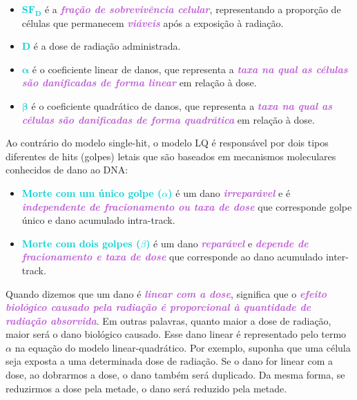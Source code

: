 \documentclass[11pt,a4paper]{article}
\newcounter{exemplo}
\begin{document}
	\begin{exemplo}[onde,]
		\begin{itemize}
			\item \textcolor{DarkTurquoise}{$\mathbf{SF_D}$} é a \textcolor{MediumOrchid}{\textbf{\textit{fração de sobrevivência celular}}}, representando a proporção de células que permanecem \textcolor{MediumOrchid}{\textbf{\textit{viáveis}}} após a exposição à radiação.
			\item \textcolor{DarkTurquoise}{$\mathbf{D}$} é a dose de radiação administrada.
			\item \textcolor{DarkTurquoise}{$\mathbf{\alpha}$} é o coeficiente linear de danos, que representa a \textcolor{MediumOrchid}{\textbf{\textit{taxa na qual as células são danificadas de forma linear}}} em relação à dose.
			\item \textcolor{DarkTurquoise}{$\mathbf{\beta}$} é o coeficiente quadrático de danos, que representa a \textcolor{MediumOrchid}{\textbf{\textit{taxa na qual as células são danificadas de forma quadrática}}} em relação à dose.
		\end{itemize}
	\end{exemplo}

	Ao contrário do modelo single-hit, o modelo LQ é responsável por dois tipos diferentes de hits (golpes) letais que são baseados em mecanismos moleculares conhecidos de dano ao DNA:
	
	\begin{itemize}[label=\textcolor{CarnationPink}{$\blacktriangleright$}]
		\item \textcolor{DarkTurquoise}{\textbf{Morte com um único golpe ($\alpha$)}} é um dano \textcolor{MediumOrchid}{\textbf{\textit{irreparável}}} e é \textcolor{MediumOrchid}{\textbf{\textit{independente de fracionamento ou taxa de dose}}} que corresponde golpe único e dano acumulado intra-track.
		\item \textcolor{DarkTurquoise}{\textbf{Morte com dois golpes ($\beta$)}} é um dano \textcolor{MediumOrchid}{\textbf{\textit{reparável}}} e \textcolor{MediumOrchid}{\textbf{\textit{depende de fracionamento e taxa de dose}}} que corresponde ao dano acumulado inter-track.
	\end{itemize}

	Quando dizemos que um dano é \textcolor{MediumOrchid}{\textbf{\textit{linear com a dose}}}, significa que o \textcolor{MediumOrchid}{\textbf{\textit{efeito biológico causado pela radiação é proporcional à quantidade de radiação absorvida}}}. Em outras palavras, quanto maior a dose de radiação, maior será o dano biológico causado. Esse dano linear é representado pelo termo $\alpha$ na equação do modelo linear-quadrático. 	Por exemplo, suponha que uma célula seja exposta a uma determinada dose de radiação. Se o dano for linear com a dose, ao dobrarmos a dose, o dano também será duplicado. Da mesma forma, se reduzirmos a dose pela metade, o dano será reduzido pela metade.
\end{document}
